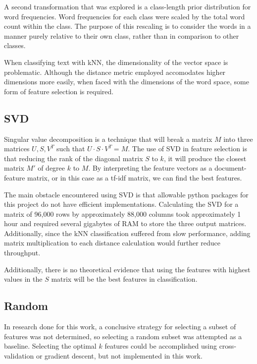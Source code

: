 \documentclass[10pt,twocolumn]{article}
\begin{document}
A second transformation that was explored is a class-length prior distribution for word frequencies. Word frequencies for each class were scaled by the total word count within the class. The purpose of this rescaling is to consider the words in a manner purely relative to their own class, rather than in comparison to other classes.

When classifying text with kNN, the dimensionality of the vector space is problematic. Although the distance metric employed accomodates higher dimensions more easily, when faced with the dimensions of the word space, some form of feature selection is required.

\subsection*{SVD}

Singular value decomposition is a technique that will break a matrix $M$ into three matrices $U, S, V^T$ such that $U \cdot S \cdot V^T = M$. The use of SVD in feature selection is that reducing the rank of the diagonal matrix $S$ to $k$, it will produce the closest matrix $M'$ of degree $k$ to $M$. By interpreting the feature vectors as a document-feature matrix, or in this case as a tf-idf matrix, we can find the best features. 

The main obstacle encountered using SVD is that allowable python packages for this project do not have efficient implementations. Calculating the SVD for a matrix of 96,000 rows by approximately 88,000 columns took approximately 1 hour and required several gigabytes of RAM to store the three output matrices. Additionally, since the kNN classification suffered from slow performance, adding matrix multiplication to each distance calculation would further reduce throughput.

Additionally, there is no theoretical evidence that using the features with highest values in the $S$ matrix will be the best features in classification.

\subsection*{Random}

In research done for this work, a conclusive strategy for selecting a subset of features was not determined, so selecting a random subset was attempted as a baseline.  Selecting the optimal $k$ features could be accomplished using cross-validation or gradient descent, but not implemented in this work.
\end{document}
